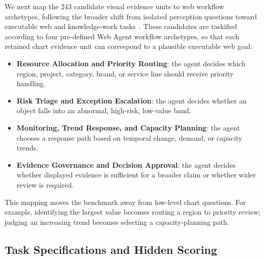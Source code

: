 \documentclass[11pt]{article}
\begin{document}
We next map the 243 candidate visual evidence units to web workflow archetypes, following the broader shift from isolated perception questions toward executable web and knowledge-work tasks~\citep{webarena2023,visualwebarena2024,workarena2024,webchorearena2025}. These candidates are taskified according to four pre-defined Web Agent workflow archetypes, so that each retained chart evidence unit can correspond to a plausible executable web goal:

\begin{itemize}
    \item \textbf{Resource Allocation and Priority Routing}: the agent decides which region, project, category, brand, or service line should receive priority handling.
    \item \textbf{Risk Triage and Exception Escalation}: the agent decides whether an object falls into an abnormal, high-risk, low-value band.
    \item \textbf{Monitoring, Trend Response, and Capacity Planning}: the agent chooses a response path based on temporal change, demand, or capacity trends.
    \item \textbf{Evidence Governance and Decision Approval}: the agent decides whether displayed evidence is sufficient for a broader claim or whether wider review is required.
\end{itemize}

This mapping moves the benchmark away from low-level chart questions. For example, identifying the largest value becomes routing a region to priority review; judging an increasing trend becomes selecting a capacity-planning path.

\subsection{Task Specifications and Hidden Scoring}
\end{document}
